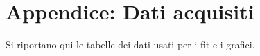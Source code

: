 \documentclass[10pt,a4paper]{article}
\begin{document}
\pagebreak
\section{Appendice: Dati acquisiti}
Si riportano qui le tabelle dei dati usati per i fit e i grafici.
\centering
\begin{figure}[H]
	\centering
	\resizebox{0.7\textwidth}{!}{
	}
	\label{tab:loop}
\end{figure}
\end{document}
